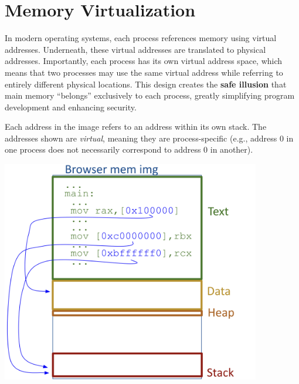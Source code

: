 \documentclass[../../compsys.tex]{subfiles}
\begin{document}
\newpage
\section{Memory Virtualization}
In modern operating systems, each process references memory using virtual addresses. Underneath, these virtual addresses are translated to physical addresses. Importantly, each process has its own virtual address space, which means that two processes may use the same virtual address while referring to entirely different physical locations. This design creates the \textbf{safe illusion} that main memory “belongs” exclusively to each process, greatly simplifying program development and enhancing security.

\noindent
\begin{minipage}{0.45\textwidth}
Each address in the image refers to an address within its own stack. The addresses shown are \emph{virtual}, meaning they are process-specific (e.g., address 0 in one process does not necessarily correspond to address 0 in another).
\end{minipage}%
\hfill
\vline
\hfill
\begin{minipage}{0.45\textwidth}
\begin{center}
    \includegraphics[width=0.85\textwidth]{chapters/L4/images/browser-img.png}
\end{center}
\end{minipage}\\[10px]
\end{document}
